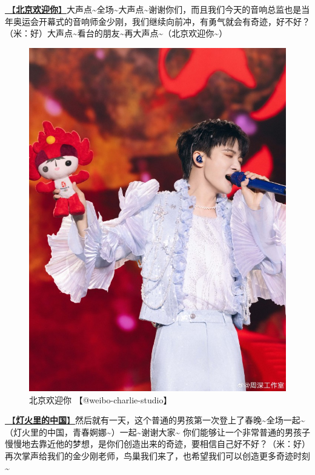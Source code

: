 \documentclass[]{ctexbook}
\begin{document}
\hyperref[welcome-to-beijing]{🎵【\textbf{北京欢迎你}】}大声点\textasciitilde 全场\textasciitilde 大声点\textasciitilde 谢谢你们，而且我们今天的音响总监也是当年奥运会开幕式的音响师金少刚，我们继续向前冲，有勇气就会有奇迹，好不好？（米：好）大声点\textasciitilde 看台的朋友\textasciitilde 再大声点\textasciitilde（北京欢迎你\textasciitilde）

\begin{figure}

{\centering \includegraphics[width=400pt]{img/beijing20240922/001} 

}

\caption{北京欢迎你 【@weibo-charlie-studio】}\label{fig:unnamed-chunk-106}
\end{figure}

\hyperref[China-in-the-light]{🎵【\textbf{灯火里的中国}】}然后就有一天，这个普通的男孩第一次登上了春晚\textasciitilde 全场一起\textasciitilde（灯火里的中国，青春婀娜\textasciitilde）一起\textasciitilde 谢谢大家\textasciitilde{}
你们能够让一个非常普通的男孩子慢慢地去靠近他的梦想，是你们创造出来的奇迹，要相信自己好不好？（米：好）再次掌声给我们的金少刚老师，鸟巢我们来了，也希望我们可以创造更多奇迹时刻\textasciitilde{}
\end{document}
